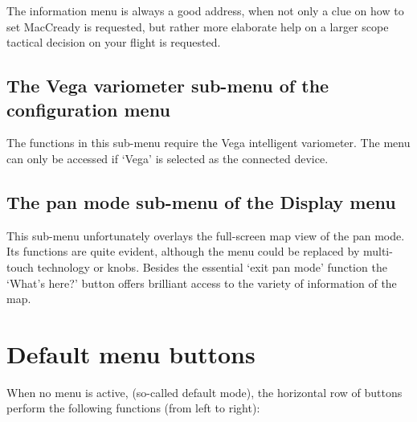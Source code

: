 The information menu is always a good address, when not only a clue on 
how to set MacCready is requested, but rather more elaborate help on a 
larger scope tactical decision on your flight is requested. %


\subsection*{The Vega variometer sub-menu of the configuration menu}
\noindent{}

The functions in this sub-menu require the Vega intelligent variometer. 
The menu can only be accessed if `Vega' is selected as the connected device.

\subsection*{The pan mode sub-menu of the Display menu}

\noindent{}

This sub-menu unfortunately overlays the full-screen map view of the pan mode.
 Its functions are quite evident, although the menu could be replaced by multi-touch
 technology or knobs. Besides the essential `exit pan mode'
 function the `What's here?' button offers brilliant access to the variety of
 information of the map.

\section{Default menu buttons}

When no menu is active, (so-called default mode), the horizontal row
of buttons perform the following functions (from left to right):


